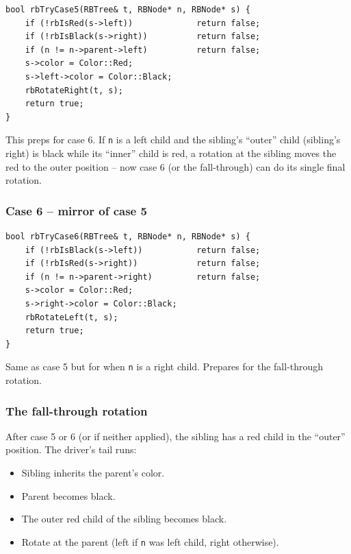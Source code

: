 \documentclass[11pt]{article}
\begin{document}
\begin{lstlisting}[basicstyle=\ttfamily\small,frame=single]
bool rbTryCase5(RBTree& t, RBNode* n, RBNode* s) {
    if (!rbIsRed(s->left))             return false;
    if (!rbIsBlack(s->right))          return false;
    if (n != n->parent->left)          return false;
    s->color = Color::Red;
    s->left->color = Color::Black;
    rbRotateRight(t, s);
    return true;
}
\end{lstlisting}

This preps for case 6. If \texttt{n} is a left child and the sibling's ``outer'' child (sibling's right) is black while its ``inner'' child is red, a rotation at the sibling moves the red to the outer position -- now case 6 (or the fall-through) can do its single final rotation.

\subsubsection*{Case 6 -- mirror of case 5}

\begin{lstlisting}[basicstyle=\ttfamily\small,frame=single]
bool rbTryCase6(RBTree& t, RBNode* n, RBNode* s) {
    if (!rbIsBlack(s->left))           return false;
    if (!rbIsRed(s->right))            return false;
    if (n != n->parent->right)         return false;
    s->color = Color::Red;
    s->right->color = Color::Black;
    rbRotateLeft(t, s);
    return true;
}
\end{lstlisting}

Same as case 5 but for when \texttt{n} is a right child. Prepares for the fall-through rotation.

\subsubsection*{The fall-through rotation}

After case 5 or 6 (or if neither applied), the sibling has a red child in the ``outer'' position. The driver's tail runs:

\begin{itemize}[leftmargin=*]
    \item Sibling inherits the parent's color.
    \item Parent becomes black.
    \item The outer red child of the sibling becomes black.
    \item Rotate at the parent (left if \texttt{n} was left child, right otherwise).
\end{itemize}
\end{document}
